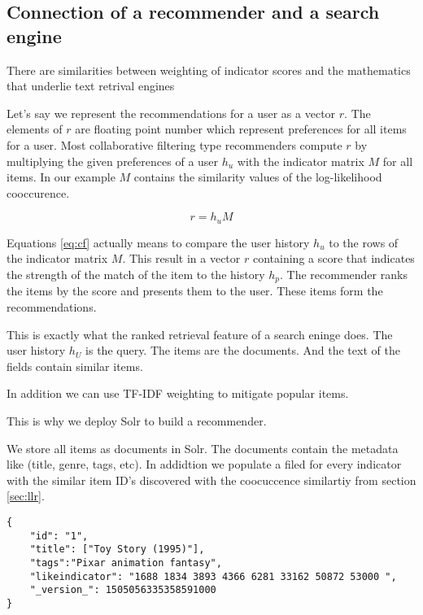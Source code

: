\subsection{Connection of a recommender and a search engine}
\label{sec:relation}

There are similarities between weighting of indicator scores and the mathematics that underlie text retrival engines

Let's say we represent the recommendations for a user as a vector $r$. The elements of $r$ are floating point number which represent preferences for all items for a user. Most collaborative filtering type recommenders compute $r$ by multiplying the given preferences of a user $h_u$ with the indicator matrix $M$ for all items. In our example $M$ contains the similarity values of the log-likelihood cooccurence.

\begin{equation}
  \label{eq:cf}
  r = h_u M
\end{equation}

Equations \ref{eq:cf} actually means to compare the user history $h_u$ to the rows of the indicator matrix $M$. This result in a vector $r$ containing a score that indicates the strength of the match of the item to the history $h_p$. The recommender ranks the items by the score and presents them to the user. These items form the recommendations.

This is exactly what the ranked retrieval feature of a search eninge does.
The user history $h_U$ is the query. The items are the documents. And the text of the fields contain similar items.

In addition we can use TF-IDF \cite{Manning} weighting to mitigate popular items.

This is why we deploy Solr to build a recommender.

We store all items as documents in Solr. The documents contain the metadata like (title, genre, tags, etc). In addidtion we populate a filed for every indicator with the similar item ID's discovered with the coocuccence similartiy from section \ref{sec:llr}.

\begin{lstlisting}[caption={Item metadata and similar items are stored in Solr.},label={lst:solrdoc}]
{
    "id": "1",
    "title": ["Toy Story (1995)"],
    "tags":"Pixar animation fantasy",
    "likeindicator": "1688 1834 3893 4366 6281 33162 50872 53000 ",
    "_version_": 1505056335358591000
}
\end{lstlisting}

